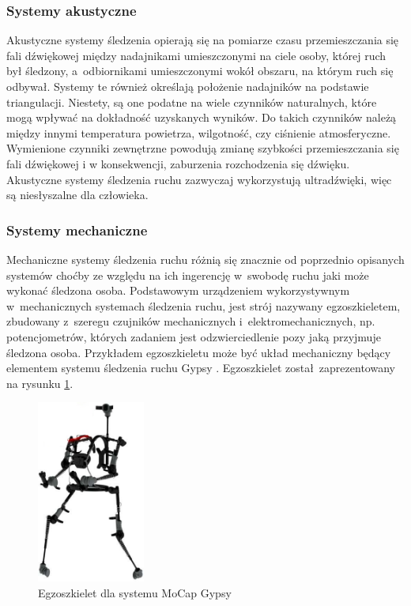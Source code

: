 \subsubsection*{Systemy akustyczne}
Akustyczne systemy śledzenia opierają się na pomiarze czasu przemieszczania się fali dźwiękowej między nadajnikami umieszczonymi na ciele osoby, której ruch był śledzony, a~odbiornikami umieszczonymi wokół obszaru, na którym ruch się odbywał. Systemy te również określają położenie nadajników na podstawie triangulacji. Niestety, są one podatne na wiele czynników naturalnych, które mogą wpływać na dokładność uzyskanych wyników. Do takich czynników należą między innymi temperatura powietrza, wilgotność, czy ciśnienie atmosferyczne. Wymienione czynniki zewnętrzne powodują zmianę szybkości przemieszczania się fali dźwiękowej i w konsekwencji, zaburzenia rozchodzenia się dźwięku. Akustyczne systemy śledzenia ruchu zazwyczaj wykorzystują ultradźwięki, więc są niesłyszalne dla człowieka.

\subsubsection*{Systemy mechaniczne}
Mechaniczne systemy śledzenia ruchu różnią się znacznie od poprzednio opisanych systemów choćby ze względu na ich ingerencję w~swobodę ruchu jaki może wykonać śledzona osoba. Podstawowym urządzeniem wykorzystywnym w~mechanicznych systemach śledzenia ruchu, jest strój nazywany egzoszkieletem, zbudowany z~szeregu czujników mechanicznych i~elektromechanicznych, np. potencjometrów, których zadaniem jest odzwierciedlenie pozy jaką przyjmuje śledzona osoba. Przykładem egzoszkieletu może być układ mechaniczny będący elementem systemu śledzenia ruchu Gypsy \cite{gypsy}. Egzoszkielet został~zaprezentowany na rysunku \ref{fig:literature:gypsy:full}.

\begin{figure}[!htp]
	\centering	
	\includegraphics[height=6cm]{images/gypsy7_full.jpg}
	\caption{Egzoszkielet dla systemu MoCap Gypsy}	
	\label{fig:literature:gypsy:full}
\end{figure}

